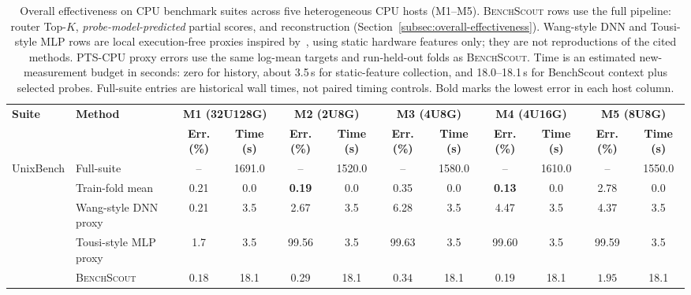 \documentclass[sigconf, review, anonymous, balance=false]{acmart}
\newcommand{\ourmethod}{\textsc{BenchScout}\xspace}
\begin{document}
\begin{table}[t]
\centering
\caption{Overall effectiveness on CPU benchmark suites across five heterogeneous CPU hosts (M1--M5).
\ourmethod{} rows use the full pipeline: router Top-$K$, \emph{probe-model-predicted} partial scores, and reconstruction (Section~\ref{subsec:overall-effectiveness}).
Wang-style DNN and Tousi-style MLP rows are local execution-free proxies inspired by~\cite{wang2019predicting,tousi2022comparative}, using static hardware features only; they are not reproductions of the cited methods.
PTS-CPU proxy errors use the same log-mean targets and run-held-out folds as \ourmethod{}. Time is an estimated new-measurement budget in seconds: zero for history, about 3.5\,s for static-feature collection, and 18.0--18.1\,s for BenchScout context plus selected probes. Full-suite entries are historical wall times, not paired timing controls. Bold marks the lowest error in each host column.}
\label{tab:overall-effectiveness-cpu}
\footnotesize
\setlength{\tabcolsep}{3.2pt}
\begin{tabular}{llcccccccccc}
\toprule
\multirow{2}{*}{\textbf{Suite}} & \multirow{2}{*}{\textbf{Method}} & \multicolumn{2}{c}{\textbf{M1 (32U128G)}} & \multicolumn{2}{c}{\textbf{M2 (2U8G)}} & \multicolumn{2}{c}{\textbf{M3 (4U8G)}} & \multicolumn{2}{c}{\textbf{M4 (4U16G)}} & \multicolumn{2}{c}{\textbf{M5 (8U8G)}} \\
\cmidrule(lr){3-4} \cmidrule(lr){5-6} \cmidrule(lr){7-8} \cmidrule(lr){9-10} \cmidrule(lr){11-12}
& & \textbf{Err. (\%)} & \textbf{Time (s)} & \textbf{Err. (\%)} & \textbf{Time (s)} & \textbf{Err. (\%)} & \textbf{Time (s)} & \textbf{Err. (\%)} & \textbf{Time (s)} & \textbf{Err. (\%)} & \textbf{Time (s)} \\
\midrule

\multirow{5}{*}{UnixBench} 
& Full-suite & -- & 1691.0 & -- & 1520.0 & -- & 1580.0 & -- & 1610.0 & -- & 1550.0 \\
& Train-fold mean & 0.21 & 0.0 & \textbf{0.19} & 0.0 & 0.35 & 0.0 & \textbf{0.13} & 0.0 & 2.78 & 0.0 \\
& Wang-style DNN proxy & 0.21 & 3.5 & 2.67 & 3.5 & 6.28 & 3.5 & 4.47 & 3.5 & 4.37 & 3.5 \\
& Tousi-style MLP proxy & 1.7 & 3.5 & 99.56 & 3.5 & 99.63 & 3.5 & 99.60 & 3.5 & 99.59 & 3.5 \\
& \ourmethod & $\mathbf{0.18}$ & 18.1 & 0.29 & 18.1 & $\mathbf{0.34}$ & 18.1 & 0.19 & 18.1 & $\mathbf{1.95}$ & 18.1 \\

\midrule


\end{tabular}
\end{table}
\end{document}
